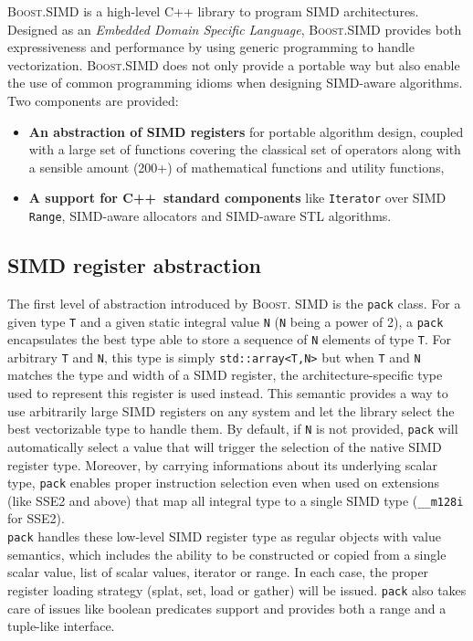 \documentclass[preprint]{sigplanconf}
\providecommand{\boostsimd}{\textsc{Boost.SIMD}}
\providecommand{\cpp}[1][~]{\textsc{C++}#1}
\begin{document}
\boostsimd{} is a high-level C++ library to program SIMD architectures. 
Designed as an \textit{Embedded Domain Specific Language}, \boostsimd{} 
provides both expressiveness and performance by using generic programming 
to handle vectorization. \boostsimd{} does not only provide a portable 
way but also enable the use of common programming idioms when designing 
SIMD-aware algorithms. Two components are provided:

\begin{itemize}
\item \textbf{An abstraction of SIMD registers} for portable algorithm design,
coupled with a large set of functions covering the classical set of operators
along with a sensible amount (200+) of mathematical functions and utility functions,
\item \textbf{A support for \cpp standard components} like \texttt{Iterator}
over SIMD \texttt{Range}, SIMD-aware allocators and SIMD-aware STL algorithms.
\end{itemize}

\subsection{SIMD register abstraction}
The first level of abstraction introduced by \textsc{Boost.} \textsc{SIMD} is
the \texttt{pack} class. For a given type \texttt{T} and a given static integral 
value \texttt{N} (\texttt{N} being a power of 2), a \texttt{pack} encapsulates
the best type able to store a sequence of \texttt{N} elements of type \texttt{T}.
For arbitrary \texttt{T} and \texttt{N}, this type is simply \texttt{std::array<T,N>}
but when \texttt{T} and \texttt{N} matches the type and width of a SIMD register,
the architecture-specific type used to represent this register is used instead.
This semantic provides a way to use arbitrarily large SIMD registers on any system
and let the library select the best vectorizable type to handle them. By default,
if \texttt{N} is not provided, \texttt{pack} will automatically select a value
that will trigger the selection of the native SIMD register type. Moreover, by
carrying informations about its underlying scalar type, \texttt{pack} enables
proper instruction selection even when used on extensions (like SSE2 and above)
that map all integral type to a single SIMD type (\texttt{\_\_m128i} for SSE2).\\

\texttt{pack} handles these low-level SIMD register type as regular objects with
value semantics, which includes the ability to be constructed or copied from a
single scalar value, list of scalar values, iterator or range. In each case, the
proper register loading strategy (splat, set, load or gather) will be issued.
\texttt{pack} also takes care of issues like boolean predicates support and provides
both a range and a tuple-like interface.
\end{document}
